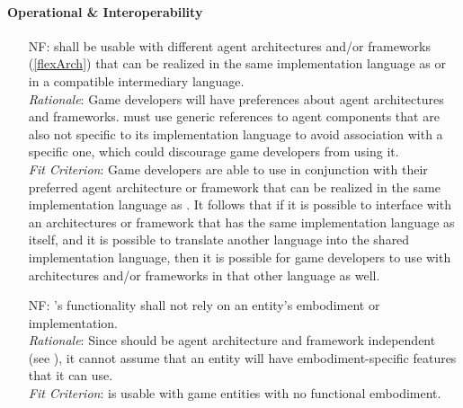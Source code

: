 \paragraph{Operational \& Interoperability}
\noindent \begin{itemize}[wide=0pt, leftmargin=*]

    \item[NF\refstepcounter{nfnum}\thenfnum \label{N_Arch}:]  \progname{} shall
    be usable with different agent architectures and/or frameworks
    (\ref{flexArch}) that can be realized in the same implementation language
    as \progname{} or in a compatible intermediary language. \vspace*{1mm}\\
    \textit{Rationale}: Game developers will have preferences about agent
    architectures and frameworks. \progname{} must use generic references to
    agent components that are also not specific to its implementation language
    to avoid association with a specific one, which could discourage game
    developers from using it. \vspace*{1mm}\\
    \textit{Fit Criterion}: Game developers are able to use \progname{} in
    conjunction with their preferred agent architecture or framework that can
    be realized in the same implementation language as \progname{}. It follows
    that if it is possible to interface \progname{} with an architectures or
    framework that has the same implementation language as itself, and it is
    possible to translate another language into the shared implementation
    language, then it is possible for game developers to use \progname{} with
    architectures and/or frameworks in that other language as well.

    \clearpage
    \item[NF\refstepcounter{nfnum}\thenfnum \label{N_Embody}:]  \progname{}'s
    functionality shall not rely on an entity's embodiment or implementation.
    \vspace*{1mm}\\
    \textit{Rationale}: Since \progname{} should be agent architecture and
    framework independent (see ), it cannot assume that an entity
    will have embodiment-specific features that it can use. \vspace*{1mm}\\
    \textit{Fit Criterion}: \progname{} is usable with game entities with no
    functional embodiment.

\end{itemize}

